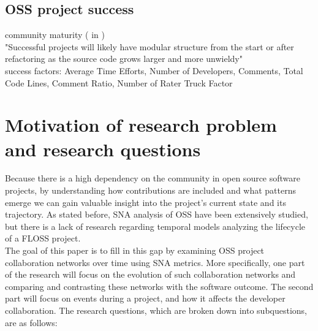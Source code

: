 \subsection{OSS project success}
community maturity (\cite{linBlogCommunityDiscovery2007} in \cite{aljemabiEmpiricalStudyEvolution2018}) \\

"Successful projects will likely have modular structure from the start or after refactoring as the source code grows larger and more unwieldy" \cite{antwerpEvolutionOpenSource2010} \\

success factors: Average Time Efforts, Number of Developers, Comments, Total Code Lines, Comment Ratio, Number of Rater \cite{yangHowMicrobloggingNetworks2013}
Truck Factor \cite{avelinoNovelApproachEstimating2016}


\section{Motivation of research problem and research questions}
Because there is a high dependency on the community in open source software projects, by understanding how contributions are included and what patterns emerge we can gain valuable insight into the project's current state and its trajectory. As stated before, SNA analysis of OSS have been extensively studied, but there is a lack of research regarding temporal models analyzing the lifecycle of a FLOSS project. \\

The goal of this paper is to fill in this gap by examining OSS project collaboration networks over time using SNA metrics. More specifically, one part of the research will focus on the evolution of such collaboration networks and comparing and contrasting these networks with the software outcome. The second part will focus on events during a project, and how it affects the developer collaboration. The research questions, which are broken down into subquestions, are as follows:


